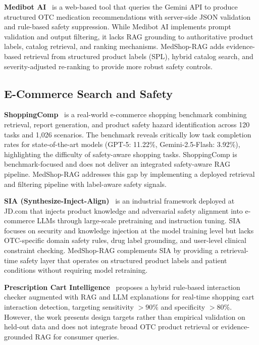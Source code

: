 \documentclass[conference]{IEEEtran}
\begin{document}
\textbf{Medibot AI}~\cite{medibot} is a web-based tool that queries the Gemini
API to produce structured OTC medication recommendations with server-side JSON
validation and rule-based safety suppression. While Medibot AI implements
prompt validation and output filtering, it lacks RAG grounding to authoritative
product labels, catalog retrieval, and ranking mechanisms. MedShop-RAG adds
evidence-based retrieval from structured product labels (SPL), hybrid catalog
search, and severity-adjusted re-ranking to provide more robust safety controls.

\subsection{E-Commerce Search and Safety}

\textbf{ShoppingComp}~\cite{shoppingcomp} is a real-world e-commerce shopping
benchmark combining retrieval, report generation, and product safety hazard
identification across 120 tasks and 1,026 scenarios. The benchmark reveals
critically low task completion rates for state-of-the-art models (GPT-5: 11.22\%,
Gemini-2.5-Flash: 3.92\%), highlighting the difficulty of safety-aware shopping
tasks. ShoppingComp is benchmark-focused and does not deliver an integrated
safety-aware RAG pipeline. MedShop-RAG addresses this gap by implementing a
deployed retrieval and filtering pipeline with label-aware safety signals.

\textbf{SIA (Synthesize-Inject-Align)}~\cite{sia} is an industrial framework
deployed at JD.com that injects product knowledge and adversarial safety
alignment into e-commerce LLMs through large-scale pretraining and instruction
tuning. SIA focuses on security and knowledge injection at the model training
level but lacks OTC-specific domain safety rules, drug label grounding, and
user-level clinical constraint checking. MedShop-RAG complements SIA by
providing a retrieval-time safety layer that operates on structured product
labels and patient conditions without requiring model retraining.

\textbf{Prescription Cart Intelligence}~\cite{cartintel} proposes a hybrid
rule-based interaction checker augmented with RAG and LLM explanations for
real-time shopping cart interaction detection, targeting sensitivity $>90\%$ and
specificity $>80\%$. However, the work presents design targets rather than
empirical validation on held-out data and does not integrate broad OTC product
retrieval or evidence-grounded RAG for consumer queries.
\end{document}
